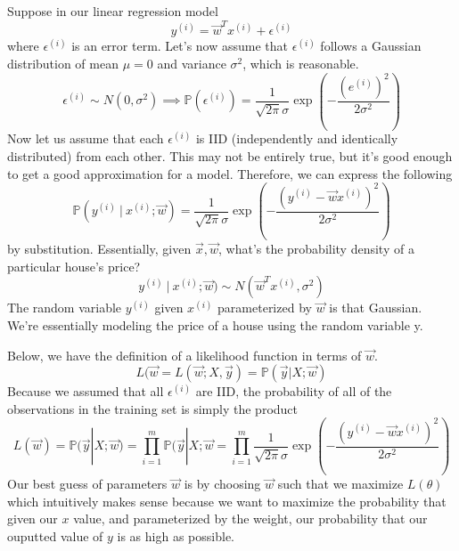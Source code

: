 \documentclass[12pt]{scrartcl}
\begin{document}
Suppose in our linear regression model
\[y^{(i)} = \vec{w}^Tx^{(i)} + \epsilon^{(i)}\]
where $\epsilon^{(i)}$ is an error term. Let's now assume that $\epsilon^{(i)}$ follows a Gaussian distribution of mean $\mu = 0$ and variance $\sigma^2$, which is reasonable.
\[\epsilon^{(i)} \sim N(0,\sigma^2) \implies \mathbb{P}(\epsilon^{(i)}) = \frac{1}{\sqrt{2\pi}\sigma}\exp(-\frac{(e^{(i)})^2}{2\sigma^2})\]
Now let us assume that each $\epsilon^{(i)}$ is IID (independently and identically distributed) from each other. This may not be entirely true, but it's good enough to get a good approximation for a model. Therefore, we can express the following
\[\mathbb{P}(y^{(i)} \ | \ x^{(i)}; \vec{w}) = \frac{1}{\sqrt{2\pi}\sigma }\exp(-\frac{(y^{(i)} - \vec{w}x^{(i)})^2}{2\sigma^2})\]
by substitution.
Essentially, given $\vec{x}, \vec{w}$, what's the probability density of a particular house's price?
\[y^{(i)} \ | \ x^{(i)}; \vec{w}) \sim N(\vec{w}^Tx^{(i)}, \sigma^2)\]
The random variable $y^{(i)}$ given $x^{(i)}$ parameterized by $\vec{w}$ is that Gaussian. We’re essentially modeling the price of a house using the random variable y.

Below, we have the definition of a likelihood function in terms of $\vec{w}$.
\[L(\vec{w} = L(\vec{w}; X, \vec{y}) = \mathbb{P}(\vec{y} | X; \vec{w})\]
Because we assumed that all $\epsilon^{(i)}$ are IID, the probability of all of the observations in the training set is simply the product
\[L(\vec{w}) = \mathbb{P}(\vec{y} | X; \vec{w}) = \prod_{i=1}^m \mathbb{P}(\vec{y} | X; \vec{w} = \prod_{i=1}^m \frac{1}{\sqrt{2\pi}\sigma }\exp(-\frac{(y^{(i)} - \vec{w}x^{(i)})^2}{2\sigma^2})\]
Our best guess of parameters $\vec{w}$ is by choosing $\vec{w}$ such that we maximize $L(\theta)$ which intuitively makes sense because we want to maximize the probability that given our $x$ value, and parameterized by the weight, our probability that our ouputted value of $y$ is as high as possible.
\end{document}
